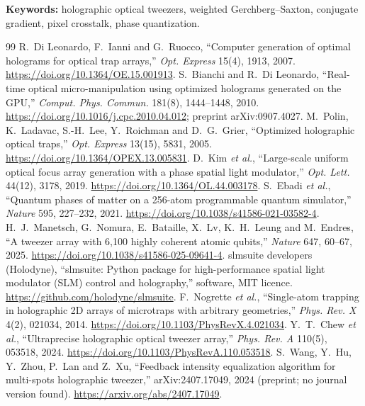 \documentclass[10pt,a4paper]{article}
\begin{document}
\noindent\textbf{Keywords:} holographic optical tweezers, weighted Gerchberg--Saxton, conjugate gradient, pixel crosstalk, phase quantization.












\begin{thebibliography}{99}\small
{} R.~Di Leonardo, F.~Ianni and G.~Ruocco, ``Computer generation of optimal holograms for optical trap arrays,'' \emph{Opt. Express} 15(4), 1913, 2007. \url{https://doi.org/10.1364/OE.15.001913}.
 S.~Bianchi and R.~Di Leonardo, ``Real-time optical micro-manipulation using optimized holograms generated on the GPU,'' \emph{Comput. Phys. Commun.} 181(8), 1444--1448, 2010. \url{https://doi.org/10.1016/j.cpc.2010.04.012}; preprint arXiv:0907.4027.
 M.~Polin, K.~Ladavac, S.-H.~Lee, Y.~Roichman and D.~G.~Grier, ``Optimized holographic optical traps,'' \emph{Opt. Express} 13(15), 5831, 2005. \url{https://doi.org/10.1364/OPEX.13.005831}.
 D.~Kim \emph{et al.}, ``Large-scale uniform optical focus array generation with a phase spatial light modulator,'' \emph{Opt. Lett.} 44(12), 3178, 2019. \url{https://doi.org/10.1364/OL.44.003178}.
 S.~Ebadi \emph{et al.}, ``Quantum phases of matter on a 256-atom programmable quantum simulator,'' \emph{Nature} 595, 227--232, 2021. \url{https://doi.org/10.1038/s41586-021-03582-4}.
 H.~J.~Manetsch, G.~Nomura, E.~Bataille, X.~Lv, K.~H.~Leung and M.~Endres, ``A tweezer array with 6,100 highly coherent atomic qubits,'' \emph{Nature} 647, 60--67, 2025. \url{https://doi.org/10.1038/s41586-025-09641-4}.
 slmsuite developers (Holodyne), ``slmsuite: Python package for high-performance spatial light modulator (SLM) control and holography,'' software, MIT licence. \url{https://github.com/holodyne/slmsuite}.
 F.~Nogrette \emph{et al.}, ``Single-atom trapping in holographic 2D arrays of microtraps with arbitrary geometries,'' \emph{Phys. Rev. X} 4(2), 021034, 2014. \url{https://doi.org/10.1103/PhysRevX.4.021034}.
 Y.~T.~Chew \emph{et al.}, ``Ultraprecise holographic optical tweezer array,'' \emph{Phys. Rev. A} 110(5), 053518, 2024. \url{https://doi.org/10.1103/PhysRevA.110.053518}.
 S.~Wang, Y.~Hu, Y.~Zhou, P.~Lan and Z.~Xu, ``Feedback intensity equalization algorithm for multi-spots holographic tweezer,'' arXiv:2407.17049, 2024 (preprint; no journal version found). \url{https://arxiv.org/abs/2407.17049}.

\end{thebibliography}
\end{document}
